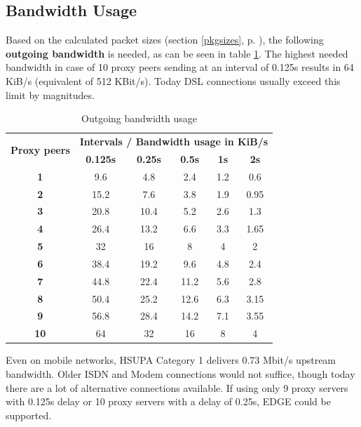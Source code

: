 \subsection{Bandwidth Usage}
\label{bwusagetheory}
Based on the calculated packet sizes (section \ref{pkgsizes}, p. \pageref{pkgsizes}), 
the following \textbf{outgoing bandwidth}
is needed, as can be seen in table \ref{bandwidth}.
The highest needed bandwidth
in case of 10 proxy peers sending at an interval of 0.125s results in 64 KiB/s
(equivalent of 512 KBit/s).
 Today DSL connections usually exceed this limit by magnitudes.
\begin{longtable}{|c|c|c|c|c|c|}
\caption{Outgoing bandwidth usage}
\label{bandwidth}\\
\hline
\multirow{2}{*}{\textbf{Proxy peers}} & \multicolumn{5}{|l|}{\textbf{Intervals / Bandwidth usage in KiB/s}} \\
& \textbf{0.125s} & \textbf{0.25s} & \textbf{0.5s} & \textbf{1s} & \textbf{2s}\\
\hline
\textbf{1} & 9.6 & 4.8 & 2.4 & 1.2 & 0.6\\
\hline
\textbf{2} & 15.2 & 7.6 & 3.8 & 1.9 & 0.95\\
\hline
\textbf{3} & 20.8 & 10.4 & 5.2 & 2.6 & 1.3\\
\hline
\textbf{4} & 26.4 & 13.2 & 6.6 & 3.3 & 1.65\\
\hline
\textbf{5} & 32 & 16 & 8 & 4 & 2\\
\hline
\textbf{6} & 38.4 & 19.2 & 9.6 & 4.8 & 2.4\\
\hline
\textbf{7} & 44.8 & 22.4 & 11.2 & 5.6 & 2.8\\
\hline
\textbf{8} & 50.4 & 25.2 & 12.6 & 6.3 & 3.15\\
\hline
\textbf{9} & 56.8 & 28.4 & 14.2 & 7.1 & 3.55\\
\hline
\textbf{10} & 64 & 32 & 16 & 8 & 4\\
\hline
\end{longtable}
Even on mobile networks, HSUPA Category 1 delivers 0.73 Mbit/s upstream bandwidth.
Older ISDN and Modem connections would not suffice, though
today there are a lot of alternative connections
 available.\cite{wiki:bitrates}
If using only 9 proxy servers with 0.125s delay or
10 proxy servers with a delay of 0.25s, EDGE could be supported.

